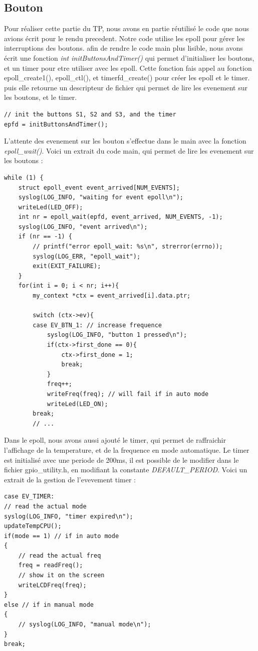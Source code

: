 \documentclass[
	a4paper, %
	10pt, %
]{CSUniSchoolLabReport}
\begin{document}
\subsection{Bouton}\label{Bouton}
Pour réaliser cette partie du TP, nous avons en partie réutilisé le code que nous avions écrit pour le rendu precedent.
Notre code utilise les epoll pour gérer les interruptions des boutons.
afin de rendre le code main plus lisible, nous avons écrit une fonction \textit{int initButtonsAndTimer()} qui permet d'initialiser les boutons, et un timer pour etre utiliser avec les epoll.
Cette fonction fais appel au fonction epoll\_create1(), epoll\_ctl(), et timerfd\_create() pour créer les epoll et le timer.
puis elle retourne un descripteur de fichier qui permet de lire les evenement sur les boutons, et le timer.
\begin{lstlisting}[style=CStyle]
// init the buttons S1, S2 and S3, and the timer
epfd = initButtonsAndTimer();
\end{lstlisting}
L'attente des evenement sur les bouton s'effectue dans le main avec la fonction \textit{epoll\_wait()}.
Voici un extrait du code main, qui permet de lire les evenement sur les boutons : \\
\begin{lstlisting}[style=CStyle]
while (1) {
	struct epoll_event event_arrived[NUM_EVENTS];
	syslog(LOG_INFO, "waiting for event epoll\n");
	writeLed(LED_OFF);
	int nr = epoll_wait(epfd, event_arrived, NUM_EVENTS, -1);
	syslog(LOG_INFO, "event arrived\n");
	if (nr == -1) {
		// printf("error epoll_wait: %s\n", strerror(errno));
		syslog(LOG_ERR, "epoll_wait");
		exit(EXIT_FAILURE);
	}
	for(int i = 0; i < nr; i++){
		my_context *ctx = event_arrived[i].data.ptr;

		switch (ctx->ev){
		case EV_BTN_1: // increase frequence
			syslog(LOG_INFO, "button 1 pressed\n");
			if(ctx->first_done == 0){
				ctx->first_done = 1;
				break;
			}
			freq++;
			writeFreq(freq); // will fail if in auto mode
			writeLed(LED_ON);
		break;
		// ...
\end{lstlisting}

Dans le epoll, nous avons aussi ajouté le timer, qui permet de raffraichir l'affichage de la temperature, et de la frequence en mode automatique.
Le timer est initialisé avec une periode de 200ms, il est possible de le modifier dans le fichier gpio\_utility.h, en modifiant la constante \textit{DEFAULT\_PERIOD}.
Voici un extrait de la gestion de l'evevement timer : \\
\begin{lstlisting}[style=CStyle]
case EV_TIMER:
// read the actual mode
syslog(LOG_INFO, "timer expired\n");
updateTempCPU();
if(mode == 1) // if in auto mode
{
	// read the actual freq
	freq = readFreq();
	// show it on the screen
	writeLCDFreq(freq); 
}
else // if in manual mode
{
	// syslog(LOG_INFO, "manual mode\n");
}
break;
\end{lstlisting}
\end{document}
